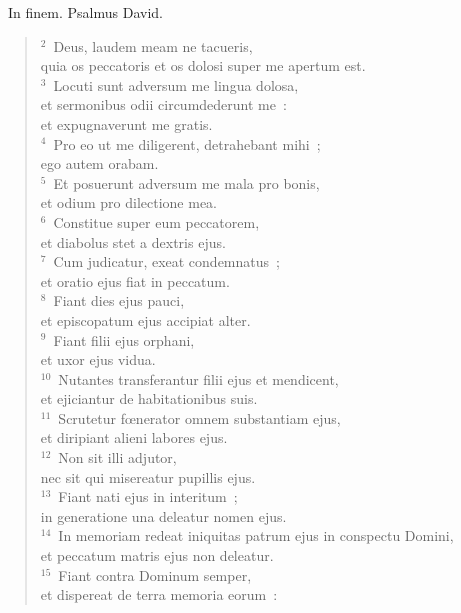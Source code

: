 ~\lettrine[lines=10,image=true,loversize=0.05,lraise=-0.03]{I}{}n finem. Psalmus David.
\begin{flushleft}\begin{verse}\vspace{6pt}${}^{2}$~Deus, laudem meam ne tacueris,\\ quia os peccatoris et os dolosi super me apertum est.\\
${}^{3}$~Locuti sunt adversum me lingua dolosa,\\ et sermonibus odii circumdederunt me~:\\ et expugnaverunt me gratis.\\
${}^{4}$~Pro eo ut me diligerent, detrahebant mihi~;\\ ego autem orabam.\\
${}^{5}$~Et posuerunt adversum me mala pro bonis,\\ et odium pro dilectione mea.\\
${}^{6}$~Constitue super eum peccatorem,\\ et diabolus stet a dextris ejus.\\
${}^{7}$~Cum judicatur, exeat condemnatus~;\\ et oratio ejus fiat in peccatum.\\
${}^{8}$~Fiant dies ejus pauci,\\ et episcopatum ejus accipiat alter.\\
${}^{9}$~Fiant filii ejus orphani,\\ et uxor ejus vidua.\\
${}^{10}$~Nutantes transferantur filii ejus et mendicent,\\ et ejiciantur de habitationibus suis.\\
${}^{11}$~Scrutetur fœnerator omnem substantiam ejus,\\ et diripiant alieni labores ejus.\\
${}^{12}$~Non sit illi adjutor,\\ nec sit qui misereatur pupillis ejus.\\
${}^{13}$~Fiant nati ejus in interitum~;\\ in generatione una deleatur nomen ejus.\\
${}^{14}$~In memoriam redeat iniquitas patrum ejus in conspectu Domini,\\ et peccatum matris ejus non deleatur.\\
${}^{15}$~Fiant contra Dominum semper,\\ et dispereat de terra memoria eorum~:\\

\end{verse}
\end{flushleft}
